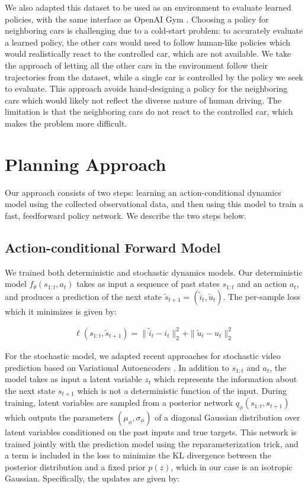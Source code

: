 \documentclass{article} %
\begin{document}
We also adapted this dataset to be used as an environment to evaluate learned policies, with the same interface as OpenAI Gym \citep{OpenAIBaselines}.
Choosing a policy for neighboring cars is challenging due to a cold-start problem: to accurately evaluate a learned policy, the other cars would need to follow human-like policies which would realistically react to the controlled car, which are not available.
We take the approach of letting all the other cars in the environment follow their trajectories from the dataset, while a single car is controlled by the policy we seek to evaluate.
This approach avoids hand-designing a policy for the neighboring cars which would likely not reflect the diverse nature of human driving.
The limitation is that the neighboring cars do not react to the controlled car, which makes the problem more difficult.


\section{Planning Approach}

Our approach consists of two steps: learning an action-conditional dynamics model using the collected observational data, and then using this model to train a fast, feedforward policy network. We describe the two steps below.

\subsection{Action-conditional Forward Model}

We trained both deterministic and stochastic dynamics models.
Our deterministic model $f_\theta(s_{1:t}, a_t)$ takes as input a sequence of past states $s_{1:t}$ and an action $a_t$, and produces a prediction of the next state $\tilde{s}_{t+1} = (\tilde{i}_t, \tilde{u}_t)$.
The per-sample loss which it minimizes is given by:

\begin{align}
  \label{eq:update-eqn}
  \ell(s_{1:t}, \tilde{s}_{t+1}) = \|\tilde{i}_t - i_t \|_2^2 + \| \tilde{u}_t - u_t \|_2^2
\end{align}


For the stochastic model, we adapted recent approaches for stochastic video prediction \citep{Babaeizadeh2018, Denton2018} based on Variational Autoencoders \citep{VAE}.
In addition to $s_{1:t}$ and $a_t$, the model takes as input a latent variable $z_t$ which represents the information about the next state $s_{t+1}$ which is not a deterministic function of the input.
During training, latent variables are sampled from a posterior network $q_\phi(s_{1:t}, s_{t+1})$ which outputs the parameters $(\mu_\phi, \sigma_\phi)$ of a diagonal Gaussian distribution over latent variables conditioned on the past inputs and true targets. This network is trained jointly with the prediction model using the reparameterization trick, and a term is included in the loss to minimize the KL divergence between the posterior distribution and a fixed prior $p(z)$, which in our case is an isotropic Gaussian.
Specifically, the updates are given by:
\end{document}
